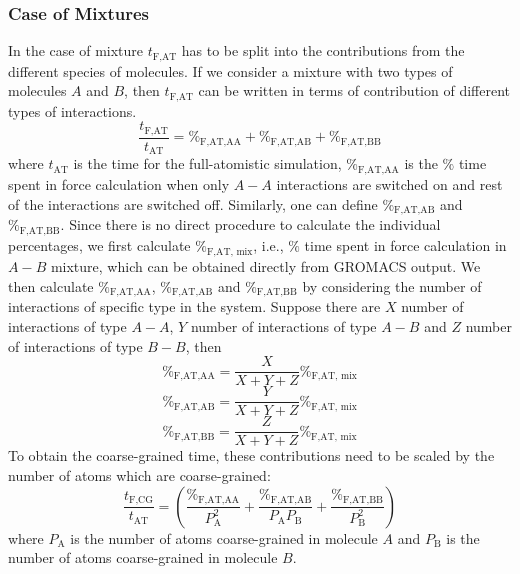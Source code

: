 \documentclass[a4paper,preprint,unsortedaddress]{revtex4-1}
\begin{document}
\subsubsection{Case of Mixtures}
{In the case of mixture $t_\text{F,AT}$ has to be split into the contributions from the different species of molecules.
If we consider a mixture with two types of molecules $A$ and $B$, then $t_\text{F,AT}$ can be written in terms 
of contribution of different types of interactions.
\begin{equation}
	\frac{t_\text{F,AT}}{t_\text{AT}}=\%_\text{F,AT,AA}+\%_\text{F,AT,AB}+\%_\text{F,AT,BB}
\end{equation}
where $t_\text{AT}$ is the time for the full-atomistic simulation, $\%_\text{F,AT,AA}$ is the 
$\%$ time spent in force calculation when only $A-A$ interactions are switched on and rest of the 
interactions are switched off. Similarly, one can define $\%_\text{F,AT,AB}$ and $\%_\text{F,AT,BB}$.
Since there is no direct procedure to calculate the individual percentages, we first calculate $\%_\text{F,AT, mix}$, i.e., 
$\%$ time spent in force calculation in $A-B$ mixture, which can be obtained directly from GROMACS output. We 
then calculate $\%_\text{F,AT,AA}$, $\%_\text{F,AT,AB}$ and $\%_\text{F,AT,BB}$ by considering the number of interactions of
specific type in the system. Suppose there are $X$ number of interactions of type $A-A$, $Y$ number of interactions of type $A-B$ and
$Z$ number of interactions of type $B-B$, then 
\begin{equation}
\%_\text{F,AT,AA} = \frac{X}{X+Y+Z} \%_\text{F,AT, mix}
\end{equation}
\begin{equation}
\%_\text{F,AT,AB} = \frac{Y}{X+Y+Z} \%_\text{F,AT, mix}
\end{equation}
\begin{equation}
\%_\text{F,AT,BB} = \frac{Z}{X+Y+Z} \%_\text{F,AT, mix}
\end{equation}
To obtain the coarse-grained time, these contributions need to be scaled by the number of atoms which are coarse-grained:
\begin{equation}
	\frac{t_\text{F,CG}}{t_\text{AT}}=(\frac{\%_\text{F,AT,AA}}{P_\text{A}^2}+\frac{\%_\text{F,AT,AB}}{P_\text{A}P_\text{B}}+\frac{\%_\text{F,AT,BB}}{P_\text{B}^2})
\end{equation}
where $P_\text{A}$ is the number of atoms coarse-grained in molecule $A$ and $P_\text{B}$ is the number of atoms coarse-grained in molecule $B$.
}
\end{document}
